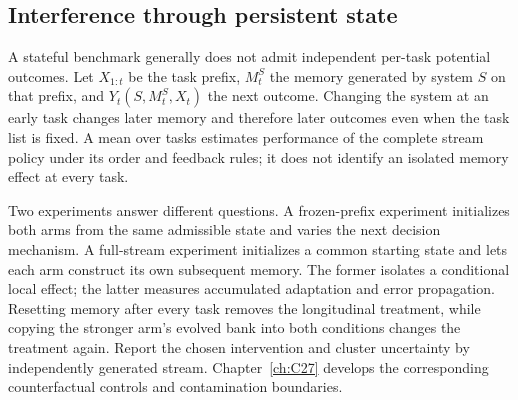 \subsection{Interference through persistent state}\label{sec:C26:stateinterference}
A stateful benchmark generally does not admit independent per-task potential outcomes. Let $X_{1:t}$ be the task prefix, $M_t^S$ the memory generated by system $S$ on that prefix, and $Y_t(S,M_t^S,X_t)$ the next outcome. Changing the system at an early task changes later memory and therefore later outcomes even when the task list is fixed. A mean over tasks estimates performance of the complete stream policy under its order and feedback rules; it does not identify an isolated memory effect at every task.

Two experiments answer different questions. A frozen-prefix experiment initializes both arms from the same admissible state and varies the next decision mechanism. A full-stream experiment initializes a common starting state and lets each arm construct its own subsequent memory. The former isolates a conditional local effect; the latter measures accumulated adaptation and error propagation. Resetting memory after every task removes the longitudinal treatment, while copying the stronger arm's evolved bank into both conditions changes the treatment again. Report the chosen intervention and cluster uncertainty by independently generated stream. Chapter~\ref{ch:C27} develops the corresponding counterfactual controls and contamination boundaries.
